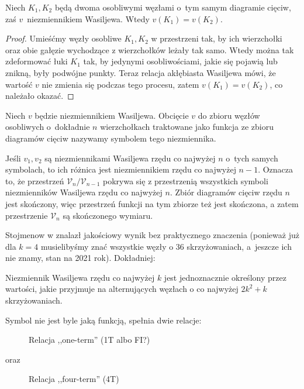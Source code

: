 
\begin{proposition}
    Niech $K_1, K_2$ będą dwoma osobliwymi węzłami o~tym samym diagramie cięciw, zaś $v$~niezmiennikiem Wasiljewa.
    Wtedy $v(K_1) = v(K_2)$.
\end{proposition}

\begin{proof}
    Umieśćmy węzły osobliwe $K_1, K_2$ w przestrzeni tak, by ich wierzchołki oraz obie gałęzie wychodzące z wierzchołków leżały tak samo. Wtedy można tak zdeformować łuki $K_1$ tak, by jedynymi osobliwościami, jakie się pojawią lub znikną, były podwójne punkty.
    Teraz relacja akłębiasta Wasiljewa mówi, że wartość $v$ nie zmienia się podczas tego procesu, zatem $v(K_1) = v(K_2)$, co należało okazać.
\end{proof}

\begin{definition}
%
    Niech $v$ będzie niezmiennikiem Wasiljewa.
    Obcięcie $v$ do zbioru węzłów osobliwych o~dokładnie $n$ wierzchołkach traktowane jako funkcja ze zbioru diagramów cięciw nazywamy symbolem tego niezmiennika.
\end{definition}

Jeśli $v_1, v_2$ są niezmiennikami Wasiljewa rzędu co najwyżej $n$ o~tych samych symbolach, to ich różnica jest niezmiennikiem rzędu co najwyżej $n - 1$.
Oznacza to, że przestrzeń $\mathcal V_n/\mathcal V_{n-1}$ pokrywa się z przestrzenią wszystkich symboli niezmienników Wasiljewa rzędu co najwyżej $n$.
Zbiór diagramów cięciw rzędu $n$ jest skończony, więc przestrzeń funkcji na tym zbiorze też jest skończona, a zatem przestrzenie $\mathcal V_n$ są skończonego wymiaru.

Stojmenow w \cite{stoimenow001} znalazł jakościowy wynik bez praktycznego znaczenia (ponieważ już dla $k = 4$ musielibyśmy znać wszystkie węzły o 36 skrzyżowaniach, a~jeszcze ich nie znamy, stan na 2021 rok).
%
Dokładniej:

\begin{proposition}
    Niezmiennik Wasiljewa rzędu co najwyżej $k$ jest jednoznacznie określony przez wartości, jakie przyjmuje na alternujących węzłach o co najwyżej $2k^2 + k$ skrzyżowaniach.
\end{proposition}

Symbol nie jest byle jaką funkcją, spełnia dwie relacje:
%
\begin{figure}[H]
\begin{comment}
    \[
        \LargeOneTerm \mapsto 0
    \]
\end{comment}
    \caption{Relacja ,,one-term'' (1T albo FI?)}
\end{figure}
oraz
\begin{figure}[H]
\begin{comment}
    \[
        \LargeFourTermA - \LargeFourTermB + \LargeFourTermC - \LargeFourTermD \mapsto 0.
    \]
\end{comment}
    \caption{Relacja ,,four-term'' (4T)}
\end{figure}

